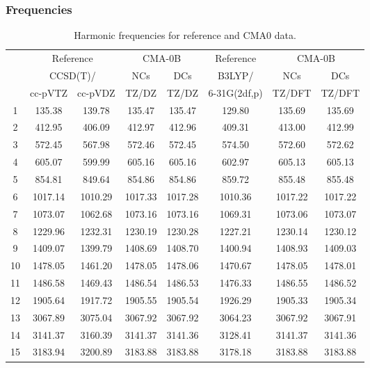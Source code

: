 \documentclass[10pt,oneside]{article}
\begin{document}
\clearpage

\subsubsection*{Frequencies}
\begin{table}[h!]
\centering
\caption{Harmonic frequencies for reference and CMA0 data.}
\begin{tabular}{cccccccc}
\toprule
{} & \multicolumn{2}{c}{Reference} & \multicolumn{2}{c}{CMA-0B} &    Reference & \multicolumn{2}{c}{CMA-0B} \\
{} & \multicolumn{2}{c}{CCSD(T)/} &     NCs &     DCs &       B3LYP/ &     NCs &     DCs \\
{} &   cc-pVTZ & cc-pVDZ &   TZ/DZ &   TZ/DZ & 6-31G(2df,p) &  TZ/DFT &  TZ/DFT \\
\midrule
1  &    135.38 &  139.78 &  135.47 &  135.47 &       129.80 &  135.69 &  135.69 \\
2  &    412.95 &  406.09 &  412.97 &  412.96 &       409.31 &  413.00 &  412.99 \\
3  &    572.45 &  567.98 &  572.46 &  572.45 &       574.50 &  572.60 &  572.62 \\
4  &    605.07 &  599.99 &  605.16 &  605.16 &       602.97 &  605.13 &  605.13 \\
5  &    854.81 &  849.64 &  854.86 &  854.86 &       859.72 &  855.48 &  855.48 \\
6  &   1017.14 & 1010.29 & 1017.33 & 1017.28 &      1010.36 & 1017.22 & 1017.22 \\
7  &   1073.07 & 1062.68 & 1073.16 & 1073.16 &      1069.31 & 1073.06 & 1073.07 \\
8  &   1229.96 & 1232.31 & 1230.19 & 1230.28 &      1227.21 & 1230.14 & 1230.12 \\
9  &   1409.07 & 1399.79 & 1408.69 & 1408.70 &      1400.94 & 1408.93 & 1409.03 \\
10 &   1478.05 & 1461.20 & 1478.05 & 1478.06 &      1470.67 & 1478.05 & 1478.01 \\
11 &   1486.58 & 1469.43 & 1486.54 & 1486.53 &      1476.33 & 1486.55 & 1486.52 \\
12 &   1905.64 & 1917.72 & 1905.55 & 1905.54 &      1926.29 & 1905.33 & 1905.34 \\
13 &   3067.89 & 3075.04 & 3067.92 & 3067.92 &      3064.23 & 3067.92 & 3067.91 \\
14 &   3141.37 & 3160.39 & 3141.37 & 3141.36 &      3128.41 & 3141.37 & 3141.36 \\
15 &   3183.94 & 3200.89 & 3183.88 & 3183.88 &      3178.18 & 3183.88 & 3183.88 \\
\bottomrule
\end{tabular}
\end{table}
\end{document}
